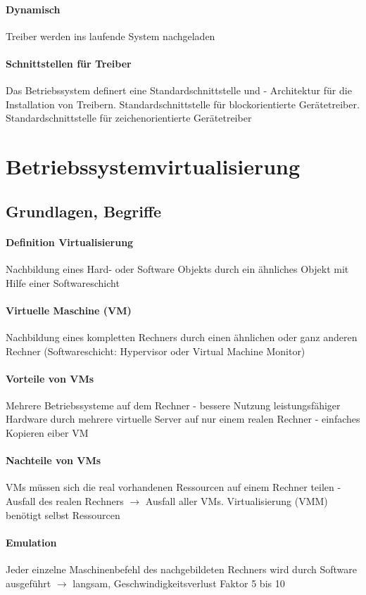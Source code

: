 \documentclass[11pt,a4paper,landscape]{article}
\begin{document}
\begin{multicols*}{3}
	\paragraph{Dynamisch} Treiber werden ins laufende System nachgeladen
	\paragraph{Schnittstellen für Treiber} Das Betriebssystem definert eine Standardschnittstelle und - Architektur für die Installation von Treibern. Standardschnittstelle für blockorientierte Gerätetreiber. Standardschnittstelle für zeichenorientierte Gerätetreiber
	\section{Betriebssystemvirtualisierung}
	\subsection{Grundlagen, Begriffe}
	\paragraph{Definition Virtualisierung} Nachbildung eines Hard- oder Software Objekts durch ein ähnliches Objekt mit Hilfe einer Softwareschicht
	\paragraph{Virtuelle Maschine (VM)} Nachbildung eines kompletten Rechners durch einen ähnlichen oder ganz anderen Rechner (Softwareschicht: Hypervisor oder Virtual Machine Monitor)
	\paragraph{Vorteile von VMs} Mehrere Betriebssysteme auf dem Rechner - bessere Nutzung leistungsfähiger Hardware durch mehrere virtuelle Server auf nur einem realen Rechner - einfaches Kopieren eiber VM
	\paragraph{Nachteile von VMs} VMs müssen sich die real vorhandenen Ressourcen auf einem Rechner teilen - Ausfall des realen Rechners $\rightarrow$ Ausfall aller VMs. Virtualisierung (VMM) benötigt selbst Ressourcen
	\paragraph{Emulation} Jeder einzelne Maschinenbefehl des nachgebildeten Rechners wird durch Software ausgeführt $\rightarrow$ langsam, Geschwindigkeitsverlust Faktor 5 bis 10

\end{multicols*}
\end{document}
